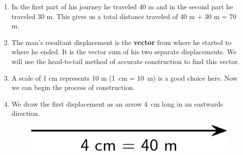 {\begin{mdframed}[linewidth=4, leftmargin=40, rightmargin=40]
\begin{exercise}
\begin{enumerate}[noitemsep, label=\textbf{Step} \textbf{\arabic*}. ]
\begin{figure}[H]
\begin{center}
      \vspace{2pt}
    \vspace{.1in}
    
    \end{center}

 \end{figure}   

    \addtocounter{footnote}{-0}
    
          \par 
          \item  
          \label{m38815*id189703}In the first part of his journey he traveled 40 m and in the second part he traveled 30 m. This gives us a total distance traveled of 40 m + 30 m = 70 m.\par 
          \item  
          \label{m38815*id189711}The man's resultant displacement is the \textbf{vector} from where he started to where he ended. It is the vector sum of his two separate displacements. We will use the head-to-tail method of accurate construction to find this vector.\par 
          \item  
          \label{m38815*id189726}A scale of 1 cm represents 10 m (1~cm = 10~m) is a good choice here. Now we can begin the process of construction.\par 
          \item  
          \label{m38815*id189736}We draw the first displacement as an arrow 4~cm long in an eastwards direction.\par 
          \label{m38815*id189740}
            
    \setcounter{subfigure}{0}


	\begin{figure}[H] %
    \begin{center}
    \label{m38815*id189744!!!underscore!!!media}\label{m38815*id189744!!!underscore!!!printimage}\includegraphics{col11305.imgs/m38815_PG11C1_046.png} %
        
      \vspace{2pt}
    \vspace{.1in}
    
    \end{center}


\end{figure}
\end{enumerate}
\end{exercise}
\end{mdframed}}
